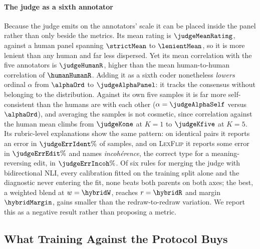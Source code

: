 \documentclass{BVP_JCLLT}
\begin{document}
\paragraph{The judge as a sixth annotator}
Because the judge emits on the annotators' scale it can be placed inside the
panel rather than only beside the metrics. Its mean rating is
$\judgeMeanRating$, against a human panel spanning $\strictMean$ to
$\lenientMean$, so it is more lenient than any human and far less dispersed. Yet
its mean correlation with the five annotators is $\judgeHumanR$, higher than the
mean human-to-human correlation of $\humanHumanR$. Adding it as a sixth coder
nonetheless \emph{lowers} ordinal $\alpha$ from $\alphaOrd$ to
$\judgeAlphaPanel$: it tracks the consensus without belonging to the
distribution. Against its own five samples it is far more self-consistent than
the humans are with each other ($\alpha=\judgeAlphaSelf$ versus $\alphaOrd$),
and averaging the samples is not cosmetic, since correlation against the human
mean climbs from $\judgeKone$ at $K=1$ to $\judgeKfive$ at $K=5$. Its
rubric-level explanations show the same pattern: on identical pairs it reports
an error in $\judgeErrIdent\%$ of samples, and on \textsc{LexFlip} it reports
some error in $\judgeErrEdit\%$ and names \emph{incoh\'erence}, the correct type
for a meaning-reversing edit, in $\judgeErrIncoh\%$. Of six rules for merging
the judge with bidirectional NLI, every calibration fitted on the training split
alone and the diagnostic never entering the fit, none beats both parents on both
axes; the best, a weighted blend at $w=\hybridW$, reaches $r=\hybridR$ and
margin $\hybridMargin$, gains smaller than the redraw-to-redraw variation. We
report this as a negative result rather than proposing a metric.

\begin{table}
\centering
\caption{Trained metrics, mean over 5 seeds, evaluated on the human-annotated
test split only. \emph{ident.}\ and \emph{unrel.}\ are the two sanity checks in
current use; \textsc{LexFlip} false-acceptance is the share of legally flipped
pairs still scored $\geq 7$ (``accurate'' under the published rubric). The
margin is the quantity defined in Section~\ref{sec:protocol}. It is shown as
`--' where a model places the identical and unrelated probes within one point of
each other, because a model with no working range has none to spend on the
edit.}\label{tab:models}
\small

\end{table}

\subsection{What Training Against the Protocol Buys}\label{sec:training}
\end{document}
